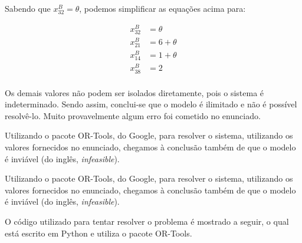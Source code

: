 \documentclass{article}
\begin{document}
Sabendo que $x^{B}_{32} = \theta$, podemos simplificar as equações acima para:

\begin{align*}
    x^{B}_{32} &= \theta \\
    x^{B}_{21} &= 6 + \theta \\
    x^{B}_{14} &= 1 + \theta \\
    x^{B}_{38} &= 2 \\
\end{align*}

Os demais valores não podem ser isolados diretamente, pois o sistema é indeterminado.
Sendo assim, conclui-se que o modelo é ilimitado e não é possível resolvê-lo.
Muito provavelmente algum erro foi cometido no enunciado.

Utilizando o pacote OR-Tools, do Google, para resolver o sistema, utilizando os valores fornecidos no enunciado, chegamos à conclusão também de que o modelo é inviável (do inglês, \textit{infeasible}).

Utilizando o pacote OR-Tools, do Google, para resolver o sistema, utilizando os valores fornecidos no enunciado, chegamos à conclusão também de que o modelo é inviável (do inglês, \textit{infeasible}).

O código utilizado para tentar resolver o problema é mostrado a seguir, o qual está escrito em Python e utiliza o pacote OR-Tools.
\end{document}
